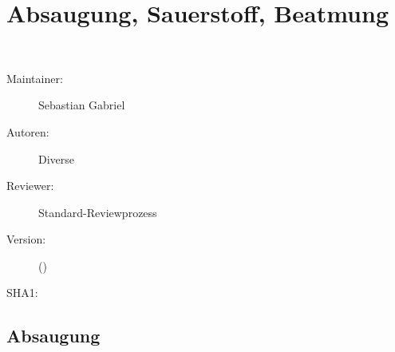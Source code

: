 % 
% 
% 

\def\ChapterCode{ASB}
\chapter
[Absaugung, Sauerstoff, Beatmung]
{Absaugung, Sauerstoff, Beatmung}
\ChapterIntro
{%
~~~
}
{%
\begin{description}
  \item[Maintainer:] Sebastian Gabriel
  \item[Autoren:] Diverse
  \item[Reviewer:] Standard-Reviewprozess
  \item[Version:] {\DocVersion} ({\DocVersionInfo})
  \item[SHA1:] {\DocGitCommit}
\end{description}

{\TxTeilkapitelAASS}
}

\clearpage
\section{Absaugung}

\label{topic:absaugkatheter}
\label{topic:absaugung-taetigkeit}
\label{topic:absaugung}
\label{topic:absauggeraete}

